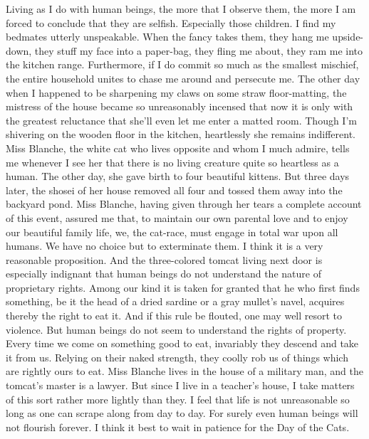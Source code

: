 \documentclass[12pt, openright]{book}
\begin{document}
Living as I do with human beings, the more that I observe them, the more
I am forced to conclude that they are selfish. Especially those
children. I find my bedmates utterly unspeakable. When the fancy takes
them, they hang me upside-down, they stuff my face into a paper-bag,
they fling me about, they ram me into the kitchen range. Furthermore, if
I do commit so much as the smallest mischief, the entire household
unites to chase me around and persecute me. The other day when I
happened to be sharpening my claws on some straw floor-matting, the
mistress of the house became so unreasonably incensed that now it is
only with the greatest reluctance that she'll even let me enter a matted
room. Though I'm shivering on the wooden floor in the kitchen,
heartlessly she remains indifferent. Miss Blanche, the white cat who
lives opposite and whom I much admire, tells me whenever I see her that
there is no living creature quite so heartless as a human. The other
day, she gave birth to four beautiful kittens. But three days later, the
shosei of her house removed all four and tossed them away into the
backyard pond. Miss Blanche, having given through her tears a complete
account of this event, assured me that, to maintain our own parental
love and to enjoy our beautiful family life, we, the cat-race, must
engage in total war upon all humans. We have no choice but to
exterminate them. I think it is a very reasonable proposition. And the
three-colored tomcat living next door is especially indignant that human
beings do not understand the nature of proprietary rights. Among our
kind it is taken for granted that he who first finds something, be it
the head of a dried sardine or a gray mullet's navel, acquires thereby
the right to eat it. And if this rule be flouted, one may well resort to
violence. But human beings do not seem to understand the rights of
property. Every time we come on something good to eat, invariably they
descend and take it from us. Relying on their naked strength, they
coolly rob us of things which are rightly ours to eat. Miss Blanche
lives in the house of a military man, and the tomcat's master is a
lawyer. But since I live in a teacher's house, I take matters of this
sort rather more lightly than they. I feel that life is not unreasonable
so long as one can scrape along from day to day. For surely even human
beings will not flourish forever. I think it best to wait in patience
for the Day of the Cats.
\end{document}
